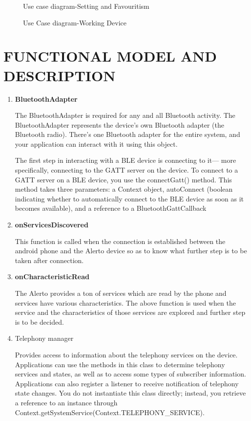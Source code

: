 \documentclass[12pt,a4paper]{report}
\begin{document}
\begin{figure}[!h]
	\begin{center}
		\caption{Use case diagram-Setting and Favouritism}
	\end{center}
\end{figure}

\begin{figure}[!h]
	\begin{center}
		\caption{Use Case diagram-Working Device}
	\end{center}
\end{figure}


\newpage
\section{FUNCTIONAL MODEL AND DESCRIPTION}
\begin{enumerate}
\item \textbf{BluetoothAdapter}

The BluetoothAdapter is required for any and all Bluetooth activity. The BluetoothAdapter represents the device's own Bluetooth adapter (the Bluetooth radio). There's one Bluetooth adapter for the entire system, and your application can interact with it using this object. 

The first step in interacting with a BLE device is connecting to it— more specifically, connecting to the GATT server on the device. To connect to a GATT server on a BLE device, you use the connectGatt() method. This method takes three parameters: a Context object, autoConnect (boolean indicating whether to automatically connect to the BLE device as soon as it becomes available), and a reference to a BluetoothGattCallback
\item \textbf{onServicesDiscovered}

This function is called when the connection is established between the android phone and the Alerto device so as to know what further step is to be taken after connection.
\item \textbf{onCharacteristicRead}

The Alerto provides a ton of services which are read by the phone and services have various characteristics. The above function is used when the service and the characteristics of those services are explored and further step is to be decided.
\item Telephony manager

Provides access to information about the telephony services on the device. Applications can use the methods in this class to determine telephony services and states, as well as to access some types of subscriber information. Applications can also register a listener to receive notification of telephony state changes.
You do not instantiate this class directly; instead, you retrieve a reference to an instance through Context.getSystemService(Context.TELEPHONY\_SERVICE).
\end{enumerate}
\end{document}
